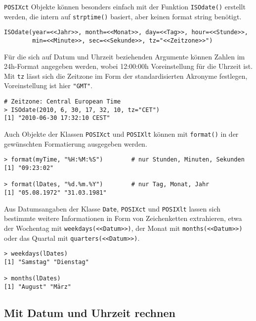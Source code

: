 \lstinline!POSIXct! Objekte können besonders einfach mit der Funktion \lstinline!ISOdate()! erstellt werden, die intern auf \lstinline!strptime()! basiert, aber keinen format string benötigt.
\begin{lstlisting}
ISOdate(year=<<Jahr>>, month=<<Monat>>, day=<<Tag>>, hour=<<Stunde>>,
        min=<<Minute>>, sec=<<Sekunde>>, tz="<<Zeitzone>>")
\end{lstlisting}

Für die sich auf Datum und Uhrzeit beziehenden Argumente können Zahlen im 24h-Format angegeben werden, wobei 12:00:00h Voreinstellung für die Uhrzeit ist. Mit \lstinline!tz! lässt sich die Zeitzone im Form der standardisierten Akronyme festlegen, Voreinstellung ist hier \lstinline!"GMT"!.
\begin{lstlisting}
# Zeitzone: Central European Time
> ISOdate(2010, 6, 30, 17, 32, 10, tz="CET")
[1] "2010-06-30 17:32:10 CEST"
\end{lstlisting}

Auch Objekte der Klassen \lstinline!POSIXct! und \lstinline!POSIXlt! können mit \lstinline!format()! in der gewünschten Formatierung ausgegeben werden.
\begin{lstlisting}
> format(myTime, "%H:%M:%S")        # nur Stunden, Minuten, Sekunden
[1] "09:23:02"

> format(lDates, "%d.%m.%Y")        # nur Tag, Monat, Jahr
[1] "05.08.1972" "31.03.1981"
\end{lstlisting}

Aus Datumsangaben der Klasse \lstinline!Date!, \lstinline!POSIXct! und \lstinline!POSIXlt! lassen sich bestimmte weitere Informationen in Form von Zeichenketten extrahieren, etwa der Wochentag mit \lstinline!weekdays(<<Datum>>)!, der Monat mit \lstinline!months(<<Datum>>)! oder das Quartal mit \lstinline!quarters(<<Datum>>)!.
\begin{lstlisting}
> weekdays(lDates)
[1] "Samstag" "Dienstag"

> months(lDates)
[1] "August" "März"
\end{lstlisting}

\subsection{Mit Datum und Uhrzeit rechnen}

